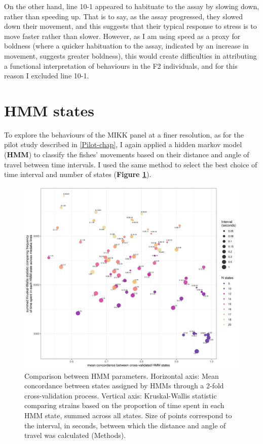 \documentclass[
]{book}
\begin{document}
On the other hand, line \textcolor{10-1_F8766D}{10-1} appeared to habituate to the assay by slowing down, rather than speeding up. That is to say, as the assay progressed, they slowed down their movement, and this suggests that their typical response to stress is to move faster rather than slower. However, as I am using speed as a proxy for boldness (where a quicker habituation to the assay, indicated by an increase in movement, suggests greater boldness), this would create difficulties in attributing a functional interpretation of behaviours in the F2 individuals, and for this reason I excluded line \textcolor{10-1_F8766D}{10-1}.

\hypertarget{hmm-states}{%
\section{HMM states}\label{hmm-states}}

To explore the behaviours of the MIKK panel at a finer resolution, as for the pilot study described in \ref{Pilot-chap}, I again applied a hidden markov model (\textbf{HMM}) to classify the fishes' movements based on their distance and angle of travel between time intervals. I used the same method to select the best choice of time interval and number of states (\textbf{Figure \ref{fig:mikk-param-comp}}).



\begin{figure}
\includegraphics[width=1\linewidth]{figs/mikk_behaviour/compare_params} \caption{Comparison between HMM parameters. Horizontal axis: Mean concordance between states assigned by HMMs through a 2-fold cross-validation process. Vertical axis: Kruskal-Wallis statistic comparing strains based on the proportion of time spent in each HMM state, summed across all states. Size of points correspond to the interval, in seconds, between which the distance and angle of travel was calculated (Methods).}\label{fig:mikk-param-comp}
\end{figure}
\end{document}
